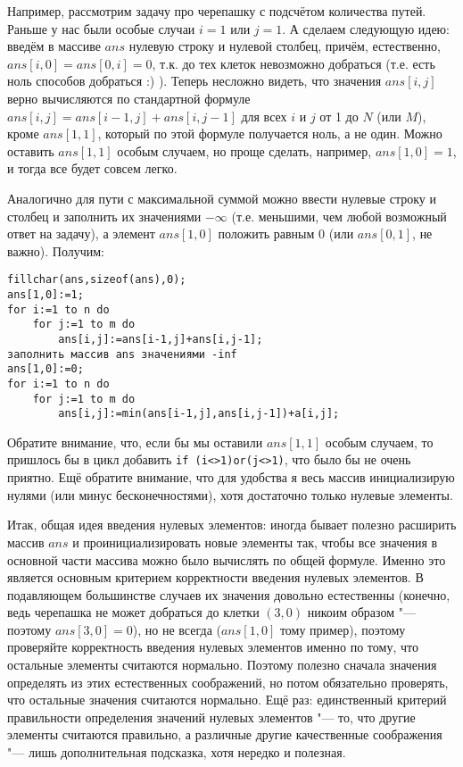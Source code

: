 Например, рассмотрим задачу про черепашку с подсчётом количества путей. Раньше у нас были особые случаи $i=1$ или $j=1$. А сделаем следующую идею: введём в массиве $ans$ нулевую строку и нулевой столбец, причём, естественно, $ans[i,0]=ans[0,i]=0$, т.к. до тех клеток невозможно добраться (т.е. есть ноль способов добраться :) ). Теперь несложно видеть, что значения $ans[i,j]$ верно вычисляются по стандартной формуле $ans[i,j]=ans[i-1,j]+ans[i,j-1]$ для всех $i$ и $j$ от 1 до $N$ (или $M$), кроме $ans[1,1]$, который по этой формуле получается ноль, а не один. Можно оставить $ans[1,1]$ особым случаем, но проще сделать, например, $ans[1,0]=1$, и тогда все будет совсем легко.

Аналогично для пути с максимальной суммой можно ввести нулевые строку и столбец и заполнить их значениями $-\infty$ (т.е. меньшими, чем любой возможный ответ на задачу), а элемент $ans[1,0]$ положить равным 0 (или $ans[0,1]$, не важно). Получим:
\begin{codesample}\begin{verbatim}
fillchar(ans,sizeof(ans),0);
ans[1,0]:=1;
for i:=1 to n do
    for j:=1 to m do
        ans[i,j]:=ans[i-1,j]+ans[i,j-1];
заполнить массив ans значениями -inf
ans[1,0]:=0;
for i:=1 to n do
    for j:=1 to m do
        ans[i,j]:=min(ans[i-1,j],ans[i,j-1])+a[i,j];
\end{verbatim}\end{codesample}
 Обратите внимание, что, если бы мы оставили $ans[1,1]$ особым случаем, то пришлось бы в цикл добавить \verb'if (i<>1)or(j<>1)', что было бы не очень приятно. Ещё обратите внимание, что для удобства я весь массив инициализирую нулями (или минус бесконечностями), хотя достаточно только нулевые элементы.
 
Итак, общая идея введения нулевых элементов: иногда бывает полезно расширить массив $ans$ и
проинициализировать новые элементы так, чтобы все значения в основной части массива можно было
вычислять по общей формуле. Именно это является основным критерием корректности введения нулевых
элементов. В подавляющем большинстве случаев их значения довольно естественны (конечно, ведь
черепашка не может добраться до клетки $(3,0)$ никоим образом "--- поэтому $ans[3,0]=0$), но не
всегда ($ans[1,0]$ тому пример), поэтому проверяйте корректность введения нулевых элементов именно
по тому, что остальные элементы считаются нормально. Поэтому полезно сначала значения определять из
этих естественных соображений, но потом обязательно проверять, что остальные значения считаются
нормально. Ещё раз: единственный критерий правильности определения значений нулевых элементов "--- 
то, что другие элементы считаются правильно, а различные другие качественные соображения "--- 
лишь дополнительная подсказка, хотя нередко и полезная.

